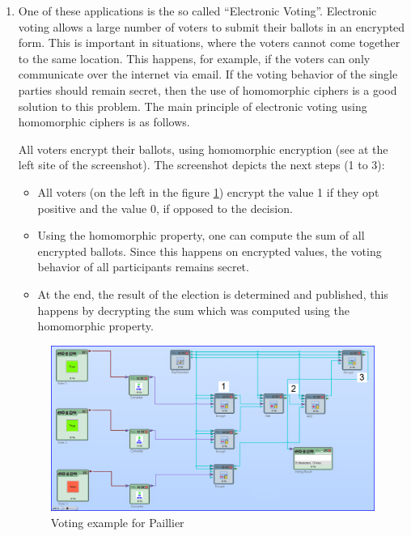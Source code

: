 \begin{enumerate}
\item One of these applications is the so called ``Electronic Voting''. Electronic voting allows a large number of voters to submit their ballots in an encrypted form. This is important in situations, where the voters cannot come together to the same location. This happens, for example, if the voters can only communicate over the internet via email. If the voting behavior of the single parties should remain secret, then the use of homomorphic ciphers is a good solution to this problem. The main principle of electronic voting using homomorphic ciphers is as follows.

All voters encrypt their ballots, using homomorphic encryption (see at the left site of the screenshot). The screenshot depicts the next steps (1 to 3):

\begin{itemize}
\item All voters (on the left in the figure \ref{CT2-PaillierVoting}) encrypt the value 1 if they opt positive and the value 0, if opposed to the decision.
\item Using the homomorphic property, one can compute the sum of all encrypted ballots. Since this happens on encrypted values, the voting behavior of all participants remains secret.
\item At the end, the result of the election is determined and published, this happens by decrypting the sum which was computed using the homomorphic property.
\end{itemize}

\begin{figure}[ht]
\begin{center}
\includegraphics[scale=0.4]{figures/CT2-PaillierVoting.png}
\caption{Voting example for Paillier} 
\label{CT2-PaillierVoting}
\end{center}
\end{figure}


\end{enumerate}
